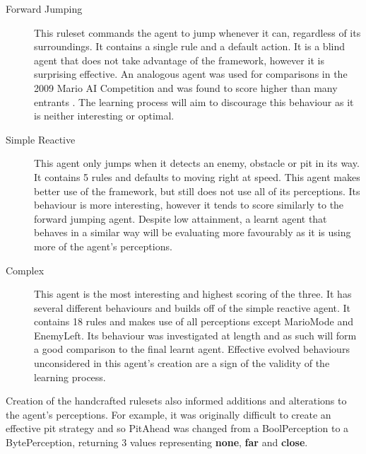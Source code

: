 \begin{description}
	\item[Forward Jumping] This ruleset commands the agent to jump whenever it can, regardless of its surroundings. It contains a single rule and a default action. It is a blind agent that does not take advantage of the framework, however it is surprising effective. An analogous agent was used for comparisons in the 2009 Mario AI Competition and was found to score higher than many entrants \cite[p.~7]{2010the}. The learning process will aim to discourage this behaviour as it is neither interesting or optimal.
	\item[Simple Reactive] This agent only jumps when it detects an enemy, obstacle or pit in its way. It contains 5 rules and defaults to moving right at speed. This agent makes better use of the framework, but still does not use all of its perceptions. Its behaviour is more interesting, however it tends to score similarly to the forward jumping agent. Despite low attainment, a learnt agent that behaves in a similar way will be evaluating more favourably as it is using more of the agent's perceptions.
	\item[Complex] This agent is the most interesting and highest scoring of the three. It has several different behaviours and builds off of the simple reactive agent. It contains 18 rules and makes use of all perceptions except MarioMode and EnemyLeft. Its behaviour was investigated at length and as such will form a good comparison to the final learnt agent. Effective evolved behaviours unconsidered in this agent's creation are a sign of the validity of the learning process. 
\end{description}
Creation of the handcrafted rulesets also informed additions and alterations to the agent's perceptions. For example, it was originally difficult to create an effective pit strategy and so PitAhead was changed from a BoolPerception to a BytePerception, returning 3 values representing \textbf{none}, \textbf{far} and \textbf{close}.

